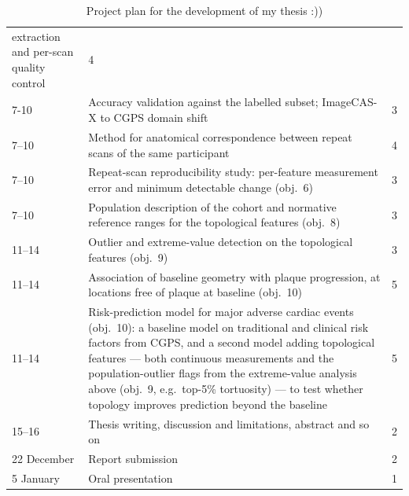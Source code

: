 \begin{table}[htbp]
\begin{tabularx}{\textwidth}{@{}l X r@{}}
             extraction and per-scan quality control & 4 \\
    7-10 & Accuracy validation against the labelled subset; ImageCAS-X to CGPS domain
             shift & 3 \\
    7--10 & Method for anatomical correspondence between repeat scans of the same
             participant & 4 \\
    7--10 & Repeat-scan reproducibility study: per-feature measurement error and minimum
             detectable change (obj.\ 6) & 3 \\
    7--10 & Population description of the cohort and normative reference ranges for the
             topological features (obj.\ 8) & 3 \\
    11--14 & Outlier and extreme-value detection on the topological features (obj.\ 9) & 3 \\
    11--14 & Association of baseline geometry with plaque progression, at locations free of
             plaque at baseline (obj.\ 10) & 5 \\
    11--14 & Risk-prediction model for major adverse cardiac events (obj.\ 10): a baseline model
             on traditional and clinical risk factors from CGPS, and a second model adding
             topological features --- both continuous measurements and the population-outlier
             flags from the extreme-value analysis above (obj.\ 9, e.g.\ top-5\% tortuosity) ---
             to test whether topology improves prediction beyond the baseline & 5 \\
    15--16 & Thesis writing, discussion and limitations, abstract and so on & 2 \\
    22 December & Report submission & 2 \\
    5 January    & Oral presentation & 1 \\
    \bottomrule
  \end{tabularx}
  \caption{Project plan for the development of my thesis :)) }  
  \label{tab:project_plan}
\end{table}

